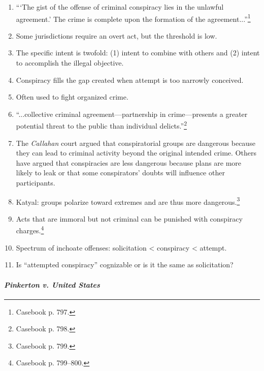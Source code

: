 \begin{enumerate}
    \item ```The gist of the offense of criminal conspiracy lies in the 
    unlawful agreement.' The crime is complete upon the formation of the 
    agreement...''\footnote{Casebook p. 797.}
    \item Some jurisdictions require an overt act, but the threshold is low.
    \item The specific intent is twofold: (1) intent to combine with others 
    and (2) intent to accomplish the illegal objective.
    \item Conspiracy fills the gap created when attempt is too narrowly 
    conceived.
    \item Often used to fight organized crime.
    \item ``...collective criminal agreement---partnership in crime---presents 
    a greater potential threat to the public than individual 
    delicts.''\footnote{Casebook p. 798.}
    \item The \emph{Callahan} court argued that conspiratorial groups are 
    dangerous because they can lead to criminal activity beyond the original 
    intended crime. Others have argued that conspiracies are less dangerous 
    because plans are more likely to leak or that some conspirators' doubts 
    will influence other participants.
    \item Katyal: groups polarize toward extremes and are thus more 
    dangerous.\footnote{Casebook p. 799.}
    \item Acts that are immoral but not criminal can be punished with 
    conspiracy charges.\footnote{Casebook p. 799--800.}
    \item Spectrum of inchoate offenses: solicitation < conspiracy < attempt.
    \item Is ``attempted conspiracy'' cognizable or is it the same as 
    solicitation?
\end{enumerate}

\paragraph{\emph{Pinkerton v. United States}}

